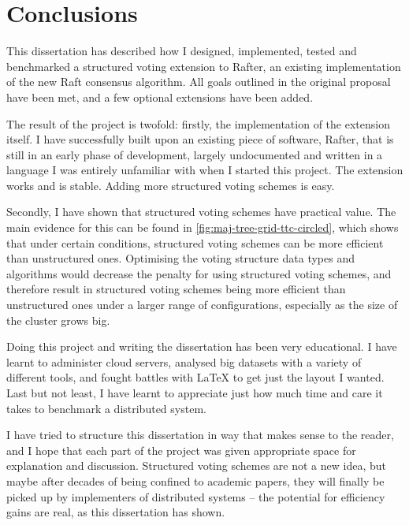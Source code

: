 \documentclass[12pt,chapterprefix=true,toc=bibliography,numbers=noendperiod,
               footnotes=multiple,twoside]{scrreprt}
\begin{document}
\chapter{Conclusions}
\label{ch:conclusions}


This dissertation has described how I designed, implemented, tested and benchmarked a structured voting extension to Rafter, an existing implementation of the new Raft consensus algorithm. All goals outlined in the original proposal have been met, and a few optional extensions have been added.


The result of the project is twofold: firstly, the implementation of the extension itself. I have successfully built upon an existing piece of software, Rafter, that is still in an early phase of development, largely undocumented and written in a language I was entirely unfamiliar with when I started this project. The extension works and is stable. Adding more structured voting schemes is easy.

Secondly, I have shown that structured voting schemes have practical value. The main evidence for this can be found in \cref{fig:maj-tree-grid-ttc-circled}, which shows that under certain conditions, structured voting schemes can be more efficient than unstructured ones. Optimising the voting structure data types and algorithms would decrease the penalty for using structured voting schemes, and therefore result in structured voting schemes being more efficient than unstructured ones under a larger range of configurations, especially as the size of the cluster grows big.


Doing this project and writing the dissertation has been very educational. I have learnt to administer cloud servers, analysed big datasets with a variety of different tools, and fought battles with \LaTeX{} to get just the layout I wanted. Last but not least, I have learnt to appreciate just how much time and care it takes to benchmark a distributed system.


I have tried to structure this dissertation in way that makes sense to the reader, and I hope that each part of the project was given appropriate space for explanation and discussion. Structured voting schemes are not a new idea, but maybe after decades of being confined to academic papers, they will finally be picked up by implementers of distributed systems -- the potential for efficiency gains are real, as this dissertation has shown.
\end{document}
